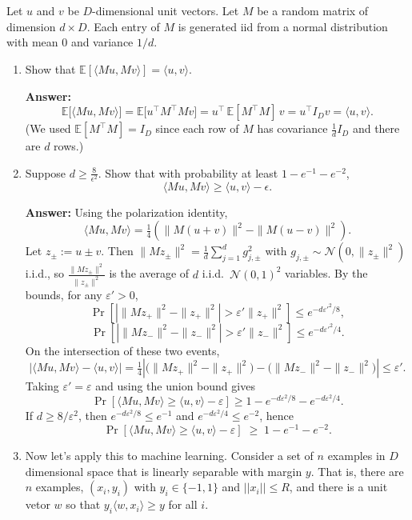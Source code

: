 \documentclass[a4paper]{article}
\begin{document}
\section{}
Let $u$ and $v$ be $D$-dimensional unit vectors. Let $M$ be a random matrix of dimension $d \times D$.
Each entry of $M$ is generated iid from a normal distribution with mean 0 and variance $1/d$.
\begin{enumerate}
    \item Show that $\mathbb{E}[\langle M u, M v\rangle ] = \langle u, v\rangle$.

\textbf{Answer:}
        $$\mathbb{E}\big[\langle Mu,Mv\rangle\big] = \mathbb{E}\big[u^\top M^\top M v\big]
= u^\top\,\mathbb{E}[M^\top M]\,v = u^\top I_D v = \langle u,v\rangle.$$
(We used $\mathbb{E}[M^\top M]=I_D$ since each row of $M$ has covariance $\frac{1}{d} I_D$ and there are $d$ rows.)
    \item Suppose $d \geq \frac{8}{\epsilon^2}$. Show that with probability at least $1 - e^{-1} - e^{-2}$,
        $$\langle M u, M v \rangle  \geq \langle u, v \rangle  - \epsilon.$$

\textbf{Answer:}
Using the polarization identity,
\[
\langle Mu,Mv\rangle
= \tfrac14\!\left(\|M(u+v)\|^2 - \|M(u-v)\|^2\right).
\]
Let $z_\pm:=u\pm v$. Then $\|Mz_\pm\|^2=\frac{1}{d}\sum_{j=1}^d g_{j,\pm}^2$ with $g_{j,\pm}\sim\mathcal{N}(0,\|z_\pm\|^2)$ i.i.d., so
$\frac{\|Mz_\pm\|^2}{\|z_\pm\|^2}$ is the average of $d$ i.i.d.\ $\mathcal{N}(0,1)^2$ variables.
By the bounds, for any $\varepsilon'>0$,
\[
\Pr\!\left[\left|\|Mz_+\|^2-\|z_+\|^2\right|>\varepsilon'\|z_+\|^2\right]\le e^{-d{\varepsilon'}^2/8},
\]
\[
\Pr\!\left[\left|\|Mz_-\|^2-\|z_-\|^2\right|>\varepsilon'\|z_-\|^2\right]\le e^{-d{\varepsilon'}^2/4}.
\]
On the intersection of these two events, 
\[
\big|\langle Mu,Mv\rangle-\langle u,v\rangle\big|
=\tfrac14\!\left|\big(\|Mz_+\|^2-\|z_+\|^2\big)-\big(\|Mz_-\|^2-\|z_-\|^2\big)\right|
\le \varepsilon'.
\]
Taking $\varepsilon'=\varepsilon$ and using the union bound gives
\[
\Pr\!\left[\langle Mu,Mv\rangle \ge \langle u,v\rangle-\varepsilon\right]
\ge 1-e^{-d\varepsilon^2/8}-e^{-d\varepsilon^2/4}.
\]
If $d\ge 8/\varepsilon^2$, then $e^{-d\varepsilon^2/8}\le e^{-1}$ and $e^{-d\varepsilon^2/4}\le e^{-2}$, hence
\[
\Pr\!\left[\langle Mu,Mv\rangle \ge \langle u,v\rangle-\varepsilon\right]\;\ge\; 1-e^{-1}-e^{-2}.
\]


    \item Now let’s apply this to machine learning. Consider a set of $n$ examples in $D$ dimensional space that is linearly separable with margin $y$.
        That is, there are $n$ examples, $(x_i , y_i )$ with $y_i \in \{-1, 1\}$ and $||x_i || \leq R$, and there is a unit vetor $w$ so that $y_i \langle w, x_i  \rangle  \geq y$ for all $i$.


\end{enumerate}
\end{document}
